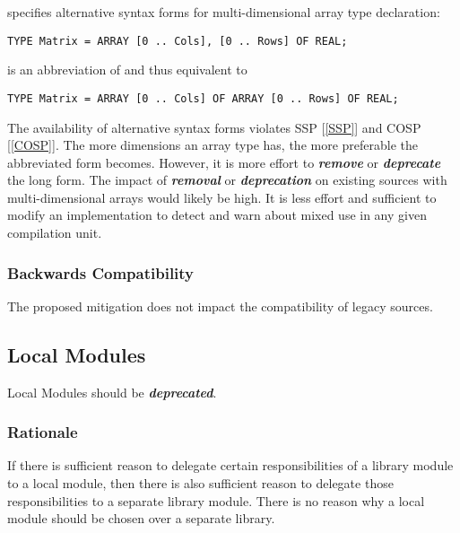 \documentclass[10pt,a4paper]{article}
\renewcommand{\emph}[1]{\textbf{\textit{#1}}}
\begin{document}
\cite[p.138]{Wirth88} specifies alternative syntax forms for multi-dimensional
array type declaration:

\lstset{style=modula2}
\begin{lstlisting}
TYPE Matrix = ARRAY [0 .. Cols], [0 .. Rows] OF REAL;
\end{lstlisting}

\noindent is an abbreviation of and thus equivalent to 
\lstset{style=modula2}
\begin{lstlisting}
TYPE Matrix = ARRAY [0 .. Cols] OF ARRAY [0 .. Rows] OF REAL;
\end{lstlisting}

\par\noindent The availability of alternative syntax forms violates
SSP [\ref{SSP}] and COSP [\ref{COSP}]. The more dimensions an array type has,
the more preferable the abbreviated form becomes. However, it is more effort
to \emph{remove} or \emph{deprecate} the long form. The impact of
\emph{removal} or \emph{deprecation} on existing sources with
multi-dimensional arrays would likely be high. It is less effort and
sufficient to modify an implementation to detect and warn about mixed use
in any given compilation unit.

\subsubsection{Backwards Compatibility}

The proposed mitigation does not impact the compatibility of legacy sources.


\subsection{Local Modules}

Local Modules should be \emph{deprecated}.

\subsubsection{Rationale}
If there is sufficient reason to delegate certain responsibilities of a library
module to a local module, then there is also sufficient reason to delegate
those responsibilities to a separate library module. There is no reason why a
local module should be chosen over a separate library.
\end{document}
